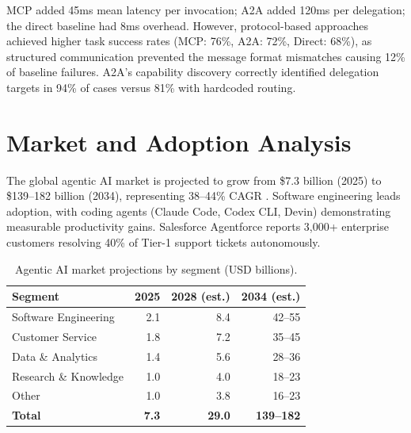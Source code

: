 \documentclass[sn-basic]{sn-jnl}
\theoremstyle{definition}
\begin{document}
MCP added 45ms mean latency per invocation; A2A added 120ms per delegation; the direct baseline had 8ms overhead. However, protocol-based approaches achieved higher task success rates (MCP: 76\%, A2A: 72\%, Direct: 68\%), as structured communication prevented the message format mismatches causing 12\% of baseline failures. A2A's capability discovery correctly identified delegation targets in 94\% of cases versus 81\% with hardcoded routing.

\section{Market and Adoption Analysis}\label{sec:market}

The global agentic AI market is projected to grow from \$7.3 billion (2025) to \$139--182 billion (2034), representing 38--44\% CAGR \citep{grandview2025agentic}. Software engineering leads adoption, with coding agents (Claude Code, Codex CLI, Devin) demonstrating measurable productivity gains. Salesforce Agentforce reports 3,000+ enterprise customers resolving 40\% of Tier-1 support tickets autonomously.

\begin{table}[ht]
\centering
\caption{Agentic AI market projections by segment (USD billions).}
\label{tab:market}
\begin{tabular}{lrrr}
\toprule
\textbf{Segment} & \textbf{2025} & \textbf{2028 (est.)} & \textbf{2034 (est.)} \\
\midrule
Software Engineering    & 2.1  & 8.4   & 42--55 \\
Customer Service        & 1.8  & 7.2   & 35--45 \\
Data \& Analytics       & 1.4  & 5.6   & 28--36 \\
Research \& Knowledge   & 1.0  & 4.0   & 18--23 \\
Other                   & 1.0  & 3.8   & 16--23 \\
\midrule
\textbf{Total}          & \textbf{7.3} & \textbf{29.0} & \textbf{139--182} \\
\bottomrule
\end{tabular}
\end{table}

\end{document}
